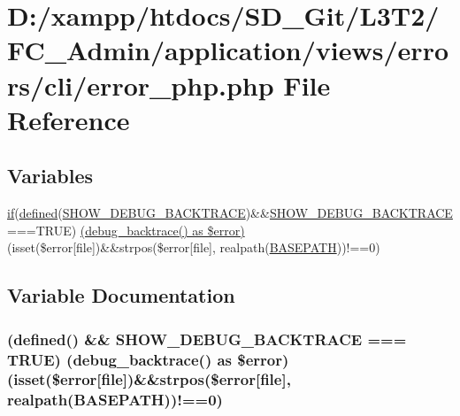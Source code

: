 \hypertarget{cli_2error__php_8php}{}\section{D\+:/xampp/htdocs/\+S\+D\+\_\+\+Git/\+L3\+T2/\+F\+C\+\_\+\+Admin/application/views/errors/cli/error\+\_\+php.php File Reference}
\label{cli_2error__php_8php}
\subsection*{Variables}
\begin{DoxyCompactItemize}
\item 
\hyperlink{assets_2js_2bootstrap_8min_8js_a87cf461060832b8b68a7b48d9e371e4f}{if}(\hyperlink{_bootstrap_8php_a46458e8654a714e0565e20f63021add9}{defined}(\textquotesingle{}\hyperlink{constants_8php_a7e2dd6fea73799257285946411aeb5ce}{S\+H\+O\+W\+\_\+\+D\+E\+B\+U\+G\+\_\+\+B\+A\+C\+K\+T\+R\+A\+C\+E}\textquotesingle{})\&\&\hyperlink{constants_8php_a7e2dd6fea73799257285946411aeb5ce}{S\+H\+O\+W\+\_\+\+D\+E\+B\+U\+G\+\_\+\+B\+A\+C\+K\+T\+R\+A\+C\+E}===T\+R\+U\+E) \hyperlink{cli_2error__php_8php_acf0b45c2a78b2e3c8689c4cfbe34a63f}{(debug\+\_\+backtrace() as \$error)} (isset(\$error\mbox{[}\textquotesingle{}file\textquotesingle{}\mbox{]})\&\&strpos(\$error\mbox{[}\textquotesingle{}file\textquotesingle{}\mbox{]}, realpath(\hyperlink{index_8php_ad39801cabfd338dc5524466fe793fda9}{B\+A\+S\+E\+P\+A\+T\+H}))!==0)
\end{DoxyCompactItemize}


\subsection{Variable Documentation}
\hypertarget{cli_2error__php_8php_acf0b45c2a78b2e3c8689c4cfbe34a63f}{}
\subsubsection[{(debug\+\_\+backtrace() as \$error)}]{({\bf defined}(\textquotesingle{}) \&\& {\bf S\+H\+O\+W\+\_\+\+D\+E\+B\+U\+G\+\_\+\+B\+A\+C\+K\+T\+R\+A\+C\+E} === T\+R\+U\+E) (debug\+\_\+backtrace() as \$error)(isset(\$error\mbox{[}\textquotesingle{}file\textquotesingle{}\mbox{]})\&\&strpos(\$error\mbox{[}\textquotesingle{}file\textquotesingle{}\mbox{]}, realpath({\bf B\+A\+S\+E\+P\+A\+T\+H}))!==0)}\label{cli_2error__php_8php_acf0b45c2a78b2e3c8689c4cfbe34a63f}
